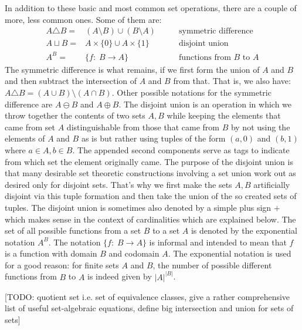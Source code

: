 \medskip
In addition to these basic and most common set operations, there are a couple of more, less common ones. Some of them are:
\begin{eqnarray}
 A \triangle B =& (A \setminus B) \cup (B \setminus A)      \qquad &\text{symmetric difference} \\
 A \sqcup B    =& A \times \{ 0 \}  \cup  A \times \{ 1 \}  \qquad &\text{disjoint union} \\
 A ^ B         =& \{ f: \; B \rightarrow A  \}              \qquad &\text{functions from $B$ to $A$} 
\end{eqnarray}
The symmetric difference is what remains, if we first form the union of $A$ and $B$ and then subtract the intersection of $A$ and $B$ from that. That is, we also have: $A \triangle B = (A \cup B) \setminus (A \cap B)$. Other possible notations for the symmetric difference are $A \ominus B$ and $A \oplus B$. The disjoint union is an operation in which we throw together the contents of two sets $A,B$ while keeping the elements that came from set $A$ distinguishable from those that came from $B$ by not using the elements of $A$ and $B$ as is but rather using tuples of the form $(a,0)$ and $(b,1)$ where $a \in A, b \in B$. The appended second components serve as tags to indicate from which set the element originally came. The purpose of the disjoint union is that many desirable set theoretic constructions involving a set union work out as desired only for disjoint sets. That's why we first make the sets $A,B$ artificially disjoint via this tuple formation and then take the union of the so created sets of tuples. The disjoint union is sometimes also denoted by a simple plus sign $+$ which makes sense in the context of cardinalities which are explained below. The set of all possible functions from a set $B$ to a set $A$ is denoted by the exponential notation $A^B$. The notation $\{ f: \; B \rightarrow A \}$ is informal and intended to mean that $f$ is a function with domain $B$ and codomain $A$. The exponential notation is used for a good reason: for finite sets $A$ and $B$, the number of possible different functions from $B$ to $A$ is indeed given by $|A|^{|B|}$.

[TODO: quotient set i.e. set of equivalence classes, give a rather comprehensive list of useful set-algebraic equations, define big intersection and union for sets of sets]




